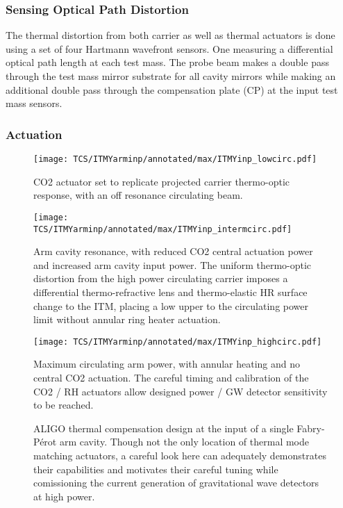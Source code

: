 \subsubsection{Sensing Optical Path Distortion}
The thermal distortion from both carrier as well as thermal actuators is done using a set of four Hartmann wavefront sensors. One measuring a differential optical path length at each test mass. The probe beam makes a double pass through the test mass mirror substrate for all cavity mirrors while making an additional double pass through the compensation plate (CP) at the input test mass sensors.

\subsubsection{Actuation}

\begin{figure}[H]
	\begin{subcaptiongroup}
		\centering
		\texttt{[image: TCS/ITMYarminp/annotated/max/ITMYinp\_lowcirc.pdf]}
		\caption{CO2 actuator set to replicate projected carrier thermo-optic response, with an off resonance circulating beam.}\label{subfig:TCSinp_lowcirc}
		\texttt{[image: TCS/ITMYarminp/annotated/max/ITMYinp\_intermcirc.pdf]}
		\caption{Arm cavity resonance, with reduced CO2 central actuation power and increased arm cavity input power. The uniform thermo-optic distortion from the high power circulating carrier imposes a differential thermo-refractive lens and thermo-elastic HR surface change to the ITM, placing a low upper to the circulating power limit without annular ring heater actuation.}\label{subfig:TCSinp_intcirc}
		\texttt{[image: TCS/ITMYarminp/annotated/max/ITMYinp\_highcirc.pdf]}
		\caption{Maximum circulating arm power, with annular heating and no central CO2 actuation. The careful timing and calibration of the CO2 / RH actuators allow designed power / GW detector sensitivity to be reached.}\label{subfig:TCSinp_highcirc}
	\end{subcaptiongroup}
	\caption{ALIGO thermal compensation design at the input of a single Fabry-P\'{e}rot arm cavity. Though not the only location of thermal mode matching actuators, a careful look here can adequately demonstrates their capabilities and motivates their careful tuning while comissioning the current generation of gravitational wave detectors at high power.}
	\label{fig:meas}
\end{figure}

